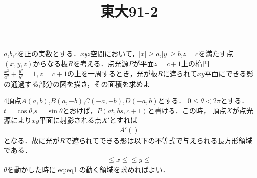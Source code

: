 \documentclass[a4j]{jarticle}
\title{東大91-2}
\begin{document}
\begin{oframed}
$a$,$b$,$c$を正の実数とする．$xyz$空間において，$|x|\ge a$,$|y|\ge b$,$z=c$を満たす点
$(x,y,z)$からなる板$R$を考える．点光源$P$が平面$z=c+1$上の楕円
$\frac{x^2}{a^2}+\frac{y^2}{b^2}=1,z=c+1$の上を一周するとき，光が板$R$に遮られて$xy$平面にできる影の通過する部分の図を描き，その面積を求めよ
\end{oframed}
\setlength{\columnseprule}{0.4pt}
\begin{multicols}{2}
\noindent\textgt{[解]} $4$頂点$A(a,b)$,$B(a,-b)$,$C(-a,-b)$,$D(-a,b)$とする．
$0\le\theta<2\pi$とする．$t=\cos\theta$,$s=\sin\theta$とおけば，$P(at,bs,c+1)$と書ける．この時，
頂点$X$が点光源により$xy$平面に射影される点$X'$とすれば
\begin{align*}
A'()
\end{align*}
となる．故に光が$R$で遮られてできる影は以下の不等式で与えられる長方形領域である．
\begin{align}
\le x\le
\le y\le
\end{align}
$\theta$を動かした時に\eqref{eq:eq1}の動く領域を求めればよい．
 \newpage

\end{multicols}
\end{document}
